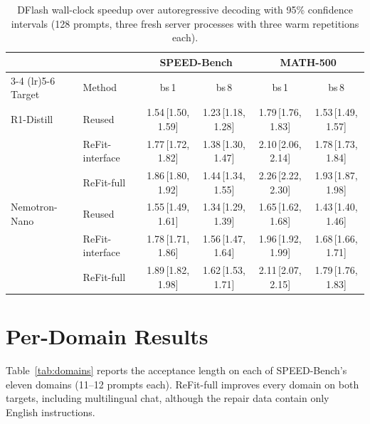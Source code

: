 \documentclass[11pt]{article}
\newcommand{\refitI}{ReFit-interface}
\newcommand{\refitF}{ReFit-full}
\begin{document}
\begin{table}[t]
  \centering
  \small
  \setlength{\tabcolsep}{4pt}
  \begin{tabular}{@{}llcccc@{}}
    \toprule
    & & \multicolumn{2}{c}{SPEED-Bench} & \multicolumn{2}{c}{MATH-500} \\
    \cmidrule(lr){3-4} \cmidrule(lr){5-6}
    Target & Method & bs\,1 & bs\,8 & bs\,1 & bs\,8 \\
    \midrule
    R1-Distill & Reused & 1.54\,{\scriptsize[1.50, 1.59]} & 1.23\,{\scriptsize[1.18, 1.28]} & 1.79\,{\scriptsize[1.76, 1.83]} & 1.53\,{\scriptsize[1.49, 1.57]} \\
     & \refitI{} & 1.77\,{\scriptsize[1.72, 1.82]} & 1.38\,{\scriptsize[1.30, 1.47]} & 2.10\,{\scriptsize[2.06, 2.14]} & 1.78\,{\scriptsize[1.73, 1.84]} \\
     & \refitF{} & 1.86\,{\scriptsize[1.80, 1.92]} & 1.44\,{\scriptsize[1.34, 1.55]} & 2.26\,{\scriptsize[2.22, 2.30]} & 1.93\,{\scriptsize[1.87, 1.98]} \\
    \midrule
    Nemotron-Nano & Reused & 1.55\,{\scriptsize[1.49, 1.61]} & 1.34\,{\scriptsize[1.29, 1.39]} & 1.65\,{\scriptsize[1.62, 1.68]} & 1.43\,{\scriptsize[1.40, 1.46]} \\
     & \refitI{} & 1.78\,{\scriptsize[1.71, 1.86]} & 1.56\,{\scriptsize[1.47, 1.64]} & 1.96\,{\scriptsize[1.92, 1.99]} & 1.68\,{\scriptsize[1.66, 1.71]} \\
     & \refitF{} & 1.89\,{\scriptsize[1.82, 1.98]} & 1.62\,{\scriptsize[1.53, 1.71]} & 2.11\,{\scriptsize[2.07, 2.15]} & 1.79\,{\scriptsize[1.76, 1.83]} \\
    \bottomrule
  \end{tabular}
  \caption{DFlash wall-clock speedup over autoregressive decoding with 95\% confidence intervals (128 prompts, three fresh server processes with three warm repetitions each).}
  \label{tab:timing-dflash}
\end{table}

\section{Per-Domain Results}
\label{app:domains}

Table~\ref{tab:domains} reports the acceptance length on each of SPEED-Bench's eleven domains (11--12 prompts each).
\refitF{} improves every domain on both targets, including multilingual chat, although the repair data contain only English instructions.
\end{document}
